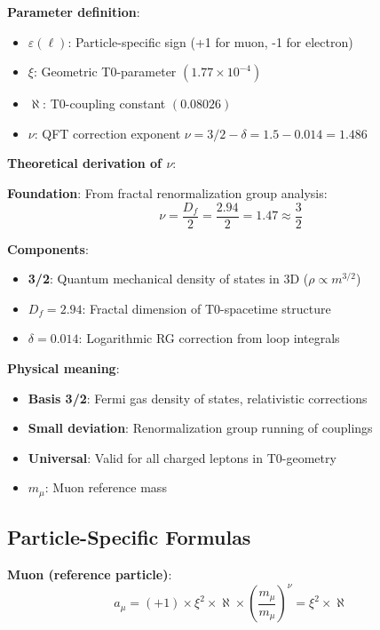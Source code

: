\documentclass[12pt,a4paper]{article}
\newcommand{\xipar}{\xi}
\newcommand{\nulep}{\nu}
\newcommand{\epsilonlep}{\varepsilon}
\begin{document}
	\textbf{Parameter definition}:
	\begin{itemize}
		\item \textbf{$\epsilonlep(\ell)$}: Particle-specific sign (+1 for muon, -1 for electron)
		\item \textbf{$\xipar$}: Geometric T0-parameter $(1.77 \times 10^{-4})$
		\item \textbf{$\aleph$}: T0-coupling constant $(0.08026)$
		\item \textbf{$\nulep$}: QFT correction exponent $\nulep = 3/2 - \delta = 1.5 - 0.014 = 1.486$
	\end{itemize}
	
	\textbf{Theoretical derivation of $\nulep$}:
	
	\textbf{Foundation}: From fractal renormalization group analysis:
	\begin{equation}
		\nulep = \frac{D_f}{2} = \frac{2.94}{2} = 1.47 \approx \frac{3}{2}
	\end{equation}
	
	\textbf{Components}:
	\begin{itemize}
		\item \textbf{3/2}: Quantum mechanical density of states in 3D ($\rho \propto m^{3/2}$)
		\item \textbf{$D_f = 2.94$}: Fractal dimension of T0-spacetime structure
		\item \textbf{$\delta = 0.014$}: Logarithmic RG correction from loop integrals
	\end{itemize}
	
	\textbf{Physical meaning}:
	\begin{itemize}
		\item \textbf{Basis 3/2}: Fermi gas density of states, relativistic corrections
		\item \textbf{Small deviation}: Renormalization group running of couplings
		\item \textbf{Universal}: Valid for all charged leptons in T0-geometry
		\item \textbf{$m_\mu$}: Muon reference mass
	\end{itemize}
	
	\subsection{Particle-Specific Formulas}
	
	\textbf{Muon (reference particle)}:
	\begin{equation}
		a_\mu = (+1) \times \xipar^2 \times \aleph \times \left(\frac{m_\mu}{m_\mu}\right)^\nulep = \xipar^2 \times \aleph
	\end{equation}
	
\end{document}
